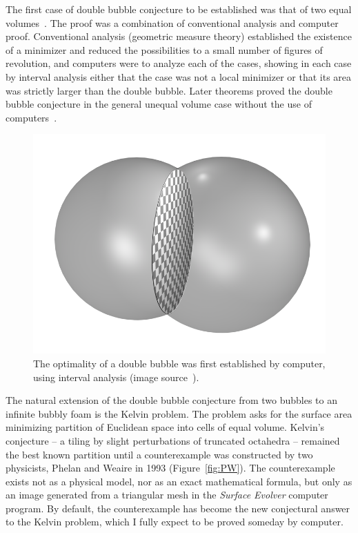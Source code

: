 \documentclass{llncs}
\begin{document}
The first case of double bubble conjecture to be established was that
of two equal volumes~\cite{HHS95}.  The proof was a combination of
conventional analysis and computer proof.  Conventional analysis
(geometric measure theory) established the existence of a minimizer
and reduced the possibilities to a small number of figures of
revolution, and computers were to analyze each of the cases, showing
in each case by interval analysis either that the case was not a local
minimizer or that its area was strictly larger than the double bubble.
Later theorems proved the double bubble conjecture in the general
unequal volume case without the use of computers~\cite{HMRR}.

\begin{figure}[h!]
  \centering
\includegraphics[scale=0.15]{Double_bubble.png}
\caption{The optimality of a double bubble was first established by
  computer, using interval analysis (image source~\cite{double}).}
\label{fig:double}
\end{figure}




The natural extension of the double bubble conjecture from two bubbles
to an infinite bubbly foam is the Kelvin problem.  The problem asks
for the surface area minimizing partition of Euclidean space into
cells of equal volume.  Kelvin's conjecture -- a tiling by slight
perturbations of truncated octahedra -- remained the best known
partition until a counterexample was constructed by two physicists,
Phelan and Weaire in 1993 (Figure~\ref{fig:PW}).  The counterexample
exists not as a physical model, nor as an exact mathematical formula,
but only as an image generated from a triangular mesh in the {\it
  Surface Evolver} computer program.  By default, the counterexample
has become the new conjectural answer to the Kelvin problem, which I
fully expect to be proved someday by computer.
\end{document}
